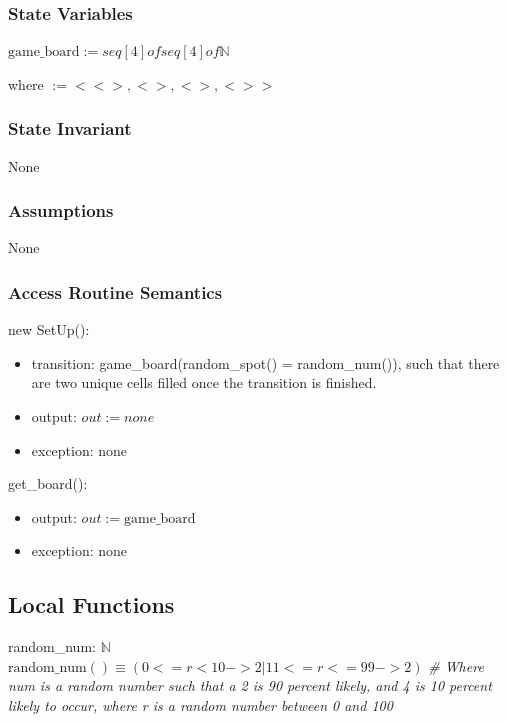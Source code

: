 \documentclass[12pt]{article}
\begin{document}
\subsubsection* {State Variables}

$\text{game\_board} := seq[4] of seq[4] of \mathbb{N}$

where  $:= < <>, <>, <>, <> >$

\subsubsection* {State Invariant}

None

\subsubsection* {Assumptions}

None

\subsubsection* {Access Routine Semantics}

\noindent new SetUp():
\begin{itemize}
\item transition: game\_board(random\_spot() = random\_num()), such that there are two unique cells filled once the transition is finished. 
\item output: $out := none$
\item exception: none
\end{itemize}

\noindent get\_board():
\begin{itemize}
\item output: $out := \text{game\_board}$
\item exception: none
\end{itemize}

\subsection*{Local Functions}

\noindent random\_num:  \rightarrow $\mathbb{N}$\\
\noindent $\mbox{random\_num}() \equiv (0 <= r < 10 -> 2 | 11 <= r <= 99 -> 2) $
\textit{\# Where num is a random number such that a 2 is 90 percent likely, and 4 is 10 percent likely to occur, where r is a random number between 0 and 100} ~\\
\end{document}
